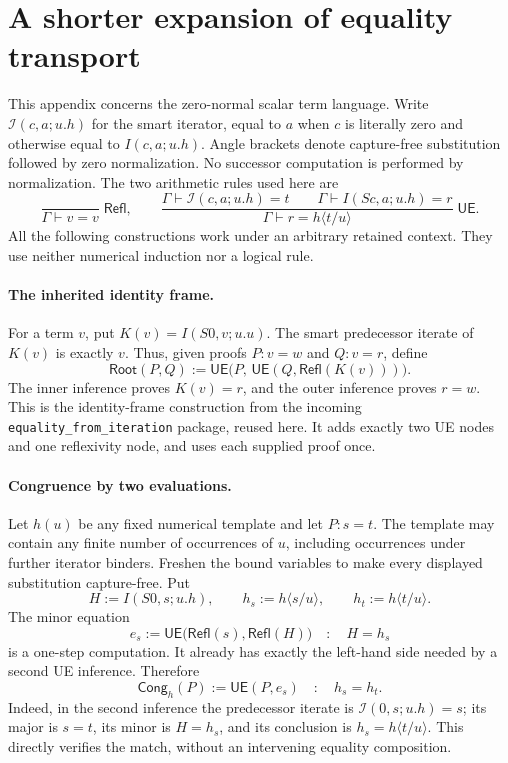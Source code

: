 \section{A shorter expansion of equality transport}
\label{sec:short-transport}

This appendix concerns the zero-normal scalar term language.  Write
\(\mathcal I(c,a;u.h)\) for the smart iterator, equal to \(a\) when
\(c\) is literally zero and otherwise equal to \(I(c,a;u.h)\).
Angle brackets denote capture-free substitution followed by zero
normalization.  No successor computation is performed by normalization.
The two arithmetic rules used here are
\[
 \frac{}{\Gamma\vdash v=v}\;{\mathsf{Refl}},
 \qquad
 \frac{\Gamma\vdash\mathcal I(c,a;u.h)=t
       \qquad\Gamma\vdash I(Sc,a;u.h)=r}
      {\Gamma\vdash r=h\langle t/u\rangle}\;{\mathsf{UE}}.
\]
All the following constructions work under an arbitrary retained context.
They use neither numerical induction nor a logical rule.

\paragraph{The inherited identity frame.}
For a term \(v\), put \(K(v)=I(S0,v;u.u)\).  The smart predecessor
iterate of \(K(v)\) is exactly \(v\).  Thus, given proofs
\(P:v=w\) and \(Q:v=r\), define
\[
 \mathsf{Root}(P,Q)
  :=\mathsf{UE}\bigl(P,\,
       \mathsf{UE}(Q,\mathsf{Refl}(K(v)))\bigr).
 \tag{R}
\]
The inner inference proves \(K(v)=r\), and the outer inference proves
\(r=w\).  This is the identity-frame construction from the incoming
\texttt{equality\_from\_iteration} package, reused here.  It adds exactly
two UE nodes and one reflexivity node, and uses each supplied proof once.

\paragraph{Congruence by two evaluations.}
Let \(h(u)\) be any fixed numerical template and let \(P:s=t\).
The template may contain any finite number of occurrences of \(u\),
including occurrences under further iterator binders.  Freshen the bound
variables to make every displayed substitution capture-free.  Put
\[
 H:=I(S0,s;u.h),\qquad
 h_s:=h\langle s/u\rangle,\qquad h_t:=h\langle t/u\rangle .
\]
The minor equation
\[
 e_s:=
 \mathsf{UE}\bigl(\mathsf{Refl}(s),\mathsf{Refl}(H)\bigr)
 \quad:\quad H=h_s
\]
is a one-step computation.  It already has exactly the left-hand side
needed by a second UE inference.  Therefore
\[
 \mathsf{Cong}_h(P)
   :=\mathsf{UE}(P,e_s)
   \quad:\quad h_s=h_t.
 \tag{C}
\]
Indeed, in the second inference the predecessor iterate is
\(\mathcal I(0,s;u.h)=s\); its major is \(s=t\), its minor is \(H=h_s\),
and its conclusion is \(h_s=h\langle t/u\rangle\).
This directly verifies the match, without an intervening equality
composition.

